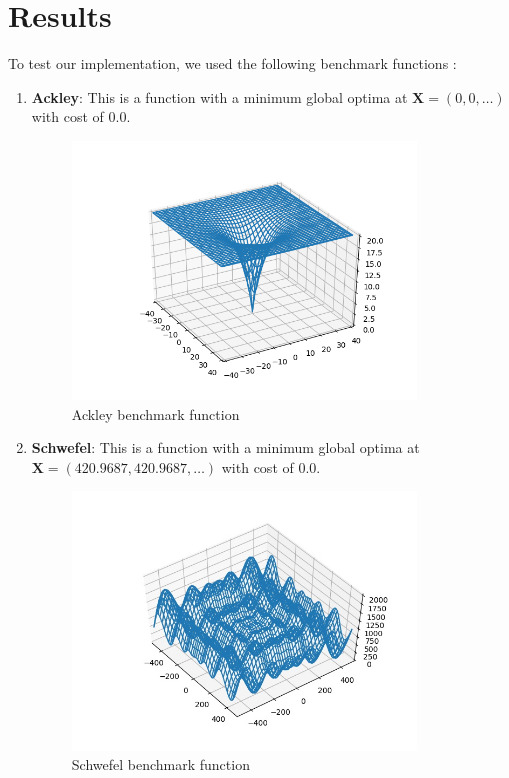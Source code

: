 \documentclass[journal,onecolumn]{IEEEtran}
\begin{document}
\section{ \textbf{Results} }
To test our implementation, we used the following benchmark functions :
\\
\begin{enumerate}
    \item \textbf{Ackley}: This is a function with a minimum global optima at $\textbf{X} = (0,0,\hdots)$ with cost of $0.0$.

    \begin{figure}[H]
    \centering
    \captionsetup{justification=centering}
    \includegraphics[width=3.6in]{_img/img_bmfunction_ackley.png}
    \caption{Ackley benchmark function}
    \end{figure}

    \item \textbf{Schwefel}: This is a function with a minimum global optima at $\textbf{X} = (420.9687,420.9687    ,\hdots)$ with cost of $0.0$.

    \begin{figure}[H]
    \centering
    \captionsetup{justification=centering}
    \includegraphics[width=3.6in]{_img/img_bmfunction_schwefel.jpeg}
    \caption{Schwefel benchmark function}
    \end{figure}


\end{enumerate}
\end{document}
